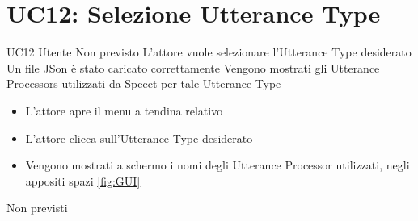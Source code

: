 \documentclass[../AnalisideiRequisiti.tex]{subfiles}
\begin{document}
\section{UC12: Selezione Utterance Type}
\UserCase
{UC12}
{Utente}
{Non previsto}
{L'attore vuole selezionare l'Utterance Type desiderato}
{Un file JSon è stato caricato correttamente }
{Vengono mostrati gli Utterance Processors utilizzati da Speect per tale Utterance Type}
{
	\begin{itemize}
		\item{} L'attore apre il menu a tendina relativo
		\item{} L'attore clicca sull'Utterance Type desiderato
		\item{} Vengono mostrati a schermo i nomi degli Utterance Processor utilizzati, negli appositi spazi \ref{fig:GUI}		
	\end{itemize}
}
{Non previsti}
\end{document}
